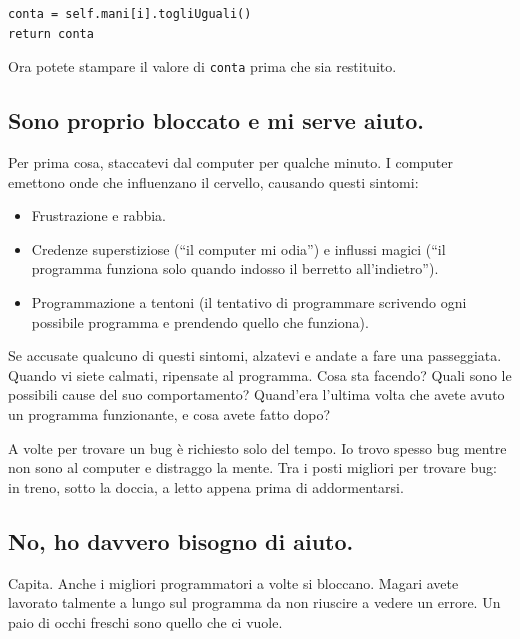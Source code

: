 \documentclass[10pt]{book}
\begin{document}
\begin{verbatim}
conta = self.mani[i].togliUguali()
return conta
\end{verbatim}
%
Ora potete stampare il valore di {\tt conta} prima che sia restituito.


\subsection{Sono proprio bloccato e mi serve aiuto.}

Per prima cosa, staccatevi dal computer per qualche minuto. I computer emettono onde che influenzano il cervello, causando questi sintomi:

\begin{itemize}

\item Frustrazione e rabbia.

\item Credenze superstiziose (``il computer mi odia'') e influssi magici (``il programma funziona solo quando indosso il berretto all'indietro'').

\item Programmazione a tentoni (il tentativo di programmare scrivendo ogni possibile programma e prendendo quello che funziona).

\end{itemize}

Se accusate qualcuno di questi sintomi, alzatevi e andate a fare una passeggiata. Quando vi siete calmati, ripensate al programma. Cosa sta facendo? Quali sono le possibili cause del suo comportamento? Quand'era l'ultima volta che avete avuto un programma funzionante, e cosa avete fatto dopo?

A volte per trovare un bug è richiesto solo del tempo. Io trovo spesso bug mentre non sono al computer e distraggo la mente. Tra i posti migliori per trovare bug: in treno, sotto la doccia, a letto appena prima di addormentarsi.


\subsection{No, ho davvero bisogno di aiuto.}

Capita. Anche i migliori programmatori a volte si bloccano. Magari avete lavorato talmente a lungo sul programma da non riuscire a vedere un errore. Un paio di occhi freschi sono quello che ci vuole.
\end{document}
